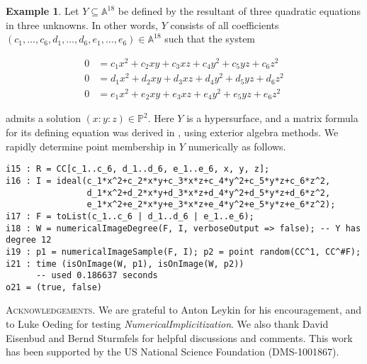 \documentclass[letter]{amsart}
\theoremstyle{definition}
\newtheorem{example}[prop]{Example}
\begin{document}
\begin{example}
Let $Y \subseteq {\mathbb{A}}^{18}$ be defined by the resultant of three quadratic equations in three unknowns.  In
other words, $Y$ consists of all coefficients $(c_1, \ldots, c_{6}, d_{1}, \ldots, d_{6}, e_{1}, \ldots, e_{6}) \in {\mathbb{A}}^{18}$ such that the system

\vspace{-0.15cm}

\[
\begin{aligned}
0 &= c_{1} x^{2} + c_{2} xy + c_{3} xz + c_{4} y^2 + c_{5} yz + c_{6} z^2 \\
0 &= d_{1} x^{2} + d_{2} xy + d_{3} xz + d_{4} y^2 + d_{5} yz + d_{6} z^2\\
0 &= e_{1} x^{2} + e_{2} xy + e_{3} xz + e_{4} y^2 + e_{5} yz + e_{6} z^2
\end{aligned}
\]

\vspace{0.05cm}

\noindent admits a solution $(x:y:z) \in {\mathbb{P}}^2$. 
Here $Y$ is a hypersurface, and a matrix formula for its defining equation was derived in \cite{ES},
using exterior algebra methods.  We rapidly determine point
membership in $Y$ numerically as follows.

\begin{verbatim}
i15 : R = CC[c_1..c_6, d_1..d_6, e_1..e_6, x, y, z];
i16 : I = ideal(c_1*x^2+c_2*x*y+c_3*x*z+c_4*y^2+c_5*y*z+c_6*z^2,
                d_1*x^2+d_2*x*y+d_3*x*z+d_4*y^2+d_5*y*z+d_6*z^2,
                e_1*x^2+e_2*x*y+e_3*x*z+e_4*y^2+e_5*y*z+e_6*z^2);
i17 : F = toList(c_1..c_6 | d_1..d_6 | e_1..e_6);
i18 : W = numericalImageDegree(F, I, verboseOutput => false); -- Y has degree 12
i19 : p1 = numericalImageSample(F, I); p2 = point random(CC^1, CC^#F);
i21 : time (isOnImage(W, p1), isOnImage(W, p2))
      -- used 0.186637 seconds
o21 = (true, false)

\end{verbatim}
\end{example}

\vspace{-0.15cm}

\noindent \textsc{Acknowledgements.} We are grateful to Anton Leykin for his encouragement, and to Luke Oeding
for testing \nobreak \textit{NumericalImplicitization}.  We also thank David Eisenbud and Bernd Sturmfels for helpful discussions and comments.  This work has been supported by the US National Science Foundation (DMS-1001867).
\end{document}
